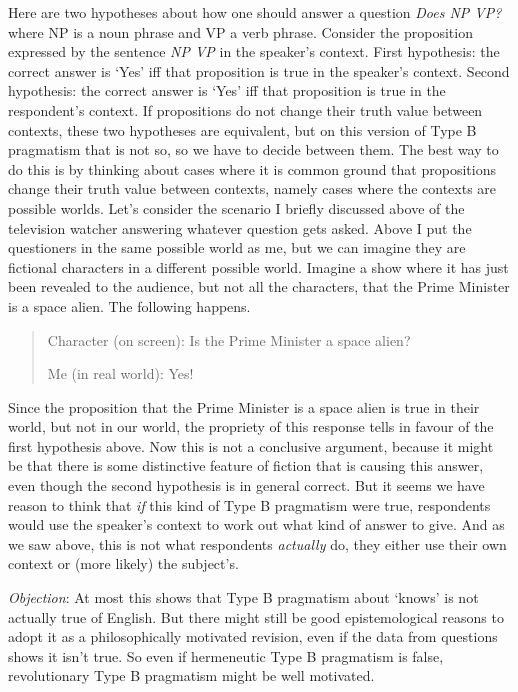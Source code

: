 \documentclass[
  10pt,
  letterpaper,
  DIV=11,
  numbers=noendperiod,
  twoside]{scrartcl}
\begin{document}
Here are two hypotheses about how one should answer a question
\emph{Does NP VP?} where NP is a noun phrase and VP a verb phrase.
Consider the proposition expressed by the sentence \emph{NP VP} in the
speaker's context. First hypothesis: the correct answer is `Yes' iff
that proposition is true in the speaker's context. Second hypothesis:
the correct answer is `Yes' iff that proposition is true in the
respondent's context. If propositions do not change their truth value
between contexts, these two hypotheses are equivalent, but on this
version of Type B pragmatism that is not so, so we have to decide
between them. The best way to do this is by thinking about cases where
it is common ground that propositions change their truth value between
contexts, namely cases where the contexts are possible worlds. Let's
consider the scenario I briefly discussed above of the television
watcher answering whatever question gets asked. Above I put the
questioners in the same possible world as me, but we can imagine they
are fictional characters in a different possible world. Imagine a show
where it has just been revealed to the audience, but not all the
characters, that the Prime Minister is a space alien. The following
happens.

\begin{quote}
Character (on screen): Is the Prime Minister a space alien?

Me (in real world): Yes!
\end{quote}

Since the proposition that the Prime Minister is a space alien is true
in their world, but not in our world, the propriety of this response
tells in favour of the first hypothesis above. Now this is not a
conclusive argument, because it might be that there is some distinctive
feature of fiction that is causing this answer, even though the second
hypothesis is in general correct. But it seems we have reason to think
that \emph{if} this kind of Type B pragmatism were true, respondents
would use the speaker's context to work out what kind of answer to give.
And as we saw above, this is not what respondents \emph{actually} do,
they either use their own context or (more likely) the subject's.

\emph{Objection}: At most this shows that Type B pragmatism about
`knows' is not actually true of English. But there might still be good
epistemological reasons to adopt it as a philosophically motivated
revision, even if the data from questions shows it isn't true. So even
if hermeneutic Type B pragmatism is false, revolutionary Type B
pragmatism might be well motivated.
\end{document}
